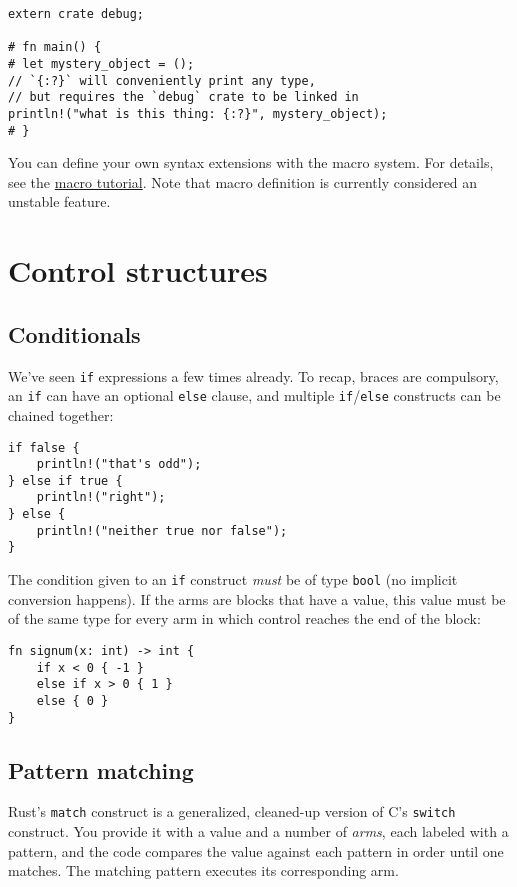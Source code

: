 \documentclass[]{article}
\begin{document}
\begin{verbatim}
extern crate debug;

# fn main() {
# let mystery_object = ();
// `{:?}` will conveniently print any type,
// but requires the `debug` crate to be linked in
println!("what is this thing: {:?}", mystery_object);
# }
\end{verbatim}

You can define your own syntax extensions with the macro system. For
details, see the \href{guide-macros.html}{macro tutorial}. Note that
macro definition is currently considered an unstable feature.

\section{Control structures}\label{control-structures}

\subsection{Conditionals}\label{conditionals}

We've seen \texttt{if} expressions a few times already. To recap, braces
are compulsory, an \texttt{if} can have an optional \texttt{else}
clause, and multiple \texttt{if}/\texttt{else} constructs can be chained
together:

\begin{verbatim}
if false {
    println!("that's odd");
} else if true {
    println!("right");
} else {
    println!("neither true nor false");
}
\end{verbatim}

The condition given to an \texttt{if} construct \emph{must} be of type
\texttt{bool} (no implicit conversion happens). If the arms are blocks
that have a value, this value must be of the same type for every arm in
which control reaches the end of the block:

\begin{verbatim}
fn signum(x: int) -> int {
    if x < 0 { -1 }
    else if x > 0 { 1 }
    else { 0 }
}
\end{verbatim}

\subsection{Pattern matching}\label{pattern-matching}

Rust's \texttt{match} construct is a generalized, cleaned-up version of
C's \texttt{switch} construct. You provide it with a value and a number
of \emph{arms}, each labeled with a pattern, and the code compares the
value against each pattern in order until one matches. The matching
pattern executes its corresponding arm.
\end{document}
